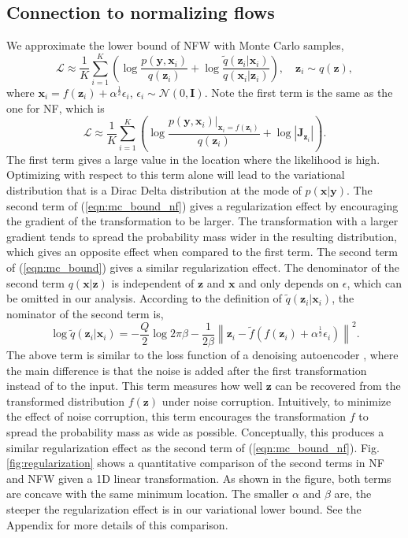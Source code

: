 \documentclass[twoside]{article}
\newcommand{\yV}{\mathbf{y}}
\newcommand{\xV}{\mathbf{x}}
\newcommand{\zV}{\mathbf{z}}
\newcommand{\bound}{\mathcal{L}}
\newcommand{\I}{\mathbf{I}}
\newcommand{\J}{\mathbf{J}}
\newcommand{\acr}[1]{\textsc{#1}\xspace}
\newcommand{\us}{\acr{NFW}}
\begin{document}
\subsection{Connection to normalizing flows}

We approximate  the lower bound of \us  with Monte Carlo samples,
\begin{equation}
\bound \approx \frac{1}{K} \sum_{i=1}^K\left( \log \frac{p(\yV, \xV_i) }{q(\zV_i)}+  \log \frac{\tilde{q}(\zV_i | \xV_i)}{q(\xV_i|\zV_i)}  \right) , \quad \zV_i \sim q(\zV), \label{eqn:mc_bound}
\end{equation}
where $\xV_i = f(\zV_i) + \alpha^{\frac{1}{2}} \epsilon_i$, $\epsilon_i \sim \mathcal{N}(0, \I)$. Note the first term is the same as the one for NF, which is 
\begin{equation}
\bound \approx \frac{1}{K} \sum_{i=1}^K   \left(\log \frac{p(\yV, \xV_i)|_{\xV_i = f(\zV_i)} }{q(\zV_i)}+  \log \left| \J_{\zV_i} \right| \right). \label{eqn:mc_bound_nf}
\end{equation}
The first term gives a large value in the location where the likelihood is high. Optimizing with respect to this term alone will lead to the variational distribution that is a Dirac Delta distribution at the mode of $p(\xV | \yV)$. The second term of (\ref{eqn:mc_bound_nf}) gives a regularization effect by encouraging the gradient of the transformation to be larger. The transformation with a larger gradient tends to spread the probability mass wider in the resulting distribution, which gives an opposite effect when compared to the first term. 
%
The second term of (\ref{eqn:mc_bound}) gives a similar regularization effect. The denominator of the second term $q(\xV|\zV)$ is independent of $\zV$ and $\xV$ and only depends on $\epsilon$, which can be omitted in our analysis. According to the definition of $\tilde{q}(\zV_i | \xV_i)$, the nominator of the second term is,
\begin{equation}
\log \tilde{q}(\zV_i | \xV_i) = -\frac{Q}{2}\log 2\pi \beta  - \frac{1}{2\beta} \left\|\zV_i-\tilde{f}(f(\zV_i) + \alpha^{\frac{1}{2}} \epsilon_i)\right\|^2. \label{eqn:regularization_term}
\end{equation}
%
The above term is similar to the loss function of a denoising autoencoder \citep{VincentEtAl2008}, where the main difference is that the noise is added after the first transformation instead of to the input. This term measures how well $\zV$ can be recovered from the transformed distribution $f(\zV)$ under noise corruption. Intuitively, to minimize the effect of noise corruption, this term encourages the transformation $f$ to spread the probability mass as wide as possible. Conceptually, this produces a similar regularization effect as the second term of (\ref{eqn:mc_bound_nf}).
%
Fig.\,\ref{fig:regularization} shows a quantitative comparison of the second terms in NF and \us given a 1D linear transformation. As shown in the figure, both terms are concave with the same minimum location. The smaller $\alpha$ and $\beta$ are, the steeper the regularization effect is in our variational lower bound. See the Appendix for more details of this comparison.
\end{document}
